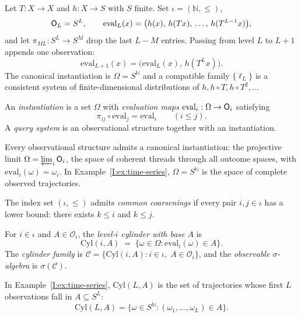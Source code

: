 \begin{example}
\label{I:ex:time-series}
Let $T : X \to X$ and $h : X \to S$ with $S$ finite.  Set
$\iota = (\mathbb{N}, \leq)$,
\[
  \mathsf{O}_{L} = S^L,
  \qquad
  \mathrm{eval}_L(x)
  = \bigl(h(x),\, h(Tx),\, \ldots,\, h(T^{L-1}x)\bigr),
\]
and let $\pi_{ML} : S^L \to S^M$ drop the last $L - M$ entries.
Passing from level $L$ to $L+1$ appends one observation:
\[
  \mathrm{eval}_{L+1}(x)
  = \bigl(\mathrm{eval}_L(x),\, h(T^L x)\bigr).
\]
The canonical instantiation is $\Omega = S^{\mathbb{N}}$ and a compatible
family $\{\ell_L\}$ is a consistent system of finite-dimensional
distributions of $h, h \circ T, h \circ T^2, \ldots$
\end{example}

\begin{definition}
\label{I:def:query-system}
An \emph{instantiation} is a set $\Omega$ with \emph{evaluation maps}
$\mathrm{eval}_i : \Omega \to \mathsf{O}_{i}$ satisfying
\[
  \pi_{ij} \circ \mathrm{eval}_j = \mathrm{eval}_i
  \qquad (i \leq j).
\]
A \emph{query system} is an observational structure together with an
instantiation.
\end{definition}

Every observational structure admits a canonical instantiation: the
projective limit $\Omega = \varprojlim_{i} \mathsf{O}_{i}$, the space of
coherent threads through all outcome spaces, with
$\mathrm{eval}_i(\omega) = \omega_i$.  In
Example~\ref{I:ex:time-series}, $\Omega = S^{\mathbb{N}}$ is the space
of complete observed trajectories.

\begin{definition}
The index set $(\iota, \leq)$ admits \emph{common coarsenings} if every pair $i, j \in \iota$ has a lower bound: there exists $k \leq i$ and $k \leq j$.
\end{definition}

\begin{definition}
\label{I:def:cylinder}
For $i \in \iota$ and $A \in \mathcal{O}_i$, the \emph{level-$i$ cylinder with base $A$} is
\[
  \mathrm{Cyl}(i, A)
  \;=\; \{\omega \in \Omega : \mathrm{eval}_i(\omega) \in A\}.
\]
The \emph{cylinder family} is $\mathcal{C} = \{\mathrm{Cyl}(i, A) : i \in \iota,\; A \in \mathcal{O}_i\}$, and the \emph{observable $\sigma$-algebra} is $\sigma(\mathcal{C})$.
\end{definition}

\noindent In Example~\ref{I:ex:time-series}, $\mathrm{Cyl}(L, A)$ is
the set of trajectories whose first $L$ observations fall in
$A \subseteq S^L$:
\[
  \mathrm{Cyl}(L, A)
  = \bigl\{\omega \in S^{\mathbb{N}} :
    (\omega_1, \ldots, \omega_L) \in A\bigr\}.
\]

